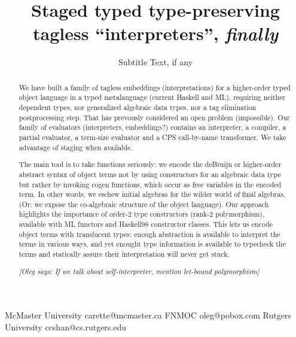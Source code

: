 \documentclass[preprint]{sigplanconf}
\newcommand{\oleg}[1]{{\it [Oleg says: #1]}}
\begin{document}
\copyrightdata{[to be supplied]} 


\title{Staged typed type-preserving tagless ``interpreters'', \emph{finally}}
\subtitle{Subtitle Text, if any}

           {McMaster University}
           {carette@mcmaster.ca}
           {FNMOC}
           {oleg@pobox.com}
           {Rutgers University}
           {ccshan@cs.rutgers.edu}

\maketitle

\begin{abstract}
We have built a family of tagless embeddings (interpretations) for a
higher-order typed object
language in a typed metalanguage (current Haskell and ML), 
requiring neither dependent
types, nor generalized algebraic data types, nor a tag elimination 
postprocessing step. That has prevously considered an open problem
(impossible). 
Our family of evaluators (interpreters, embeddings?) contains 
an interpreter, a compiler, a partial
evaluator, a term-size evaluator and a CPS call-by-name transformer.
We take advantage of staging when available.

The main tool is to take functions seriously: we encode the
deBruijn or higher-order abstract syntax  of object terms 
not by using constructors for
an algebraic data type but rather by invoking cogen functions, which occur as
free variables in the encoded term.  In other words, we eschew initial
algebras for the wilder world of final algebras.
(Or: we expose the co-algebraic structure of the object language).
Our approach highlights the importance of order-2 type constructors
(rank-2 polymorphism), available with ML functors and
Haskell98 constructor classes. This lets us encode object terms with
translucent types: enough abstraction is available to interpret the
terms in various ways, and yet enought type information is available 
to typecheck the terms and statically assure their interpretation will
never get stuck.

\oleg{If we talk about self-interpreter, mention let-bound polymorphism}
\end{abstract}
\end{document}
